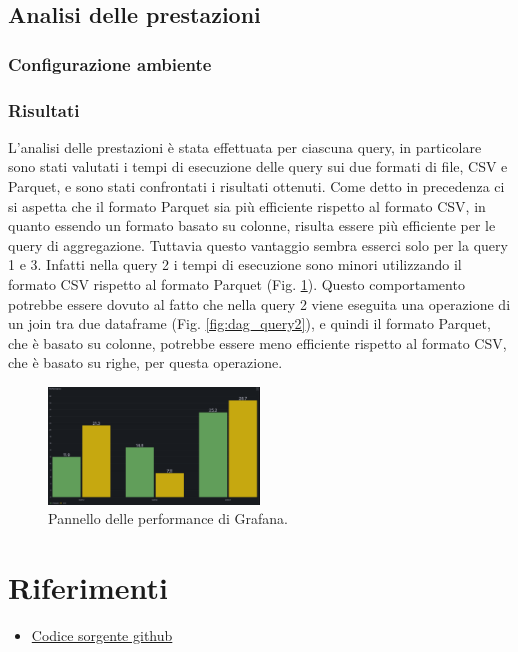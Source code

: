 \documentclass[conference]{IEEEtran}
\begin{document}
\subsection{Analisi delle prestazioni}
\subsubsection{Configurazione ambiente}
\subsubsection{Risultati}
L'analisi delle prestazioni è stata effettuata per ciascuna query, in particolare sono stati valutati i tempi di esecuzione delle query sui due formati di file, CSV e Parquet, e sono stati confrontati i risultati ottenuti.
Come detto in precedenza ci si aspetta che il formato Parquet sia più efficiente rispetto al formato CSV, in quanto essendo un formato basato su colonne, risulta essere più efficiente per le query di aggregazione.
Tuttavia questo vantaggio sembra esserci solo per la query 1 e 3. Infatti nella query 2 i tempi di esecuzione sono minori utilizzando il formato CSV rispetto al formato Parquet (Fig. \ref{fig:performance_panel}).
Questo comportamento potrebbe essere dovuto al fatto che nella query 2 viene eseguita una operazione di un join tra due dataframe (Fig. \ref{fig:dag_query2}), e quindi il formato Parquet, che è basato su colonne, potrebbe essere meno efficiente rispetto al formato CSV, che è basato su righe, per questa operazione.

\begin{figure}[H]
    \centerline{\includegraphics[width=0.5\textwidth]{res/performance_panel.png}}
    \caption{Pannello delle performance di Grafana.}
    \label{fig:performance_panel}
\end{figure}

\section{Riferimenti}
\begin{itemize}
    \item \href{https://github.com/matteo-conti-97/hard_disk_failure_data_processing}{Codice sorgente github}
\end{itemize}
\vspace{12pt}
\end{document}
